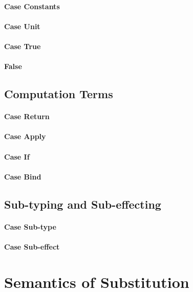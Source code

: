 {    \paragraph{Case Constants}
        \todo{}
    \paragraph{Case Unit}
        \todo{}
    \paragraph{Case True}
        \todo{}
    \paragraph{False}
        \todo{}
    \subsection{Computation Terms}
    \paragraph{Case Return}  
    \paragraph{Case Apply}
        \todo{}
    \paragraph{Case If}
        \todo{}
    \paragraph{Case Bind}
        \todo{}
    \subsection{Sub-typing and Sub-effecting}
    \paragraph{Case Sub-type}
        \todo{}
    \paragraph{Case Sub-effect}
        \todo{}
    \section{Semantics of Substitution}
}
